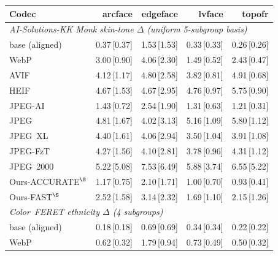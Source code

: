 \begin{tabular}{lrrrr}
\toprule
Codec & arcface & edgeface & lvface & topofr \\
\midrule
\multicolumn{5}{l}{\emph{AI-Solutions-KK Monk skin-tone $\Delta$ (uniform 5-subgroup basis)}}\\
\midrule
    base (aligned) & 0.37\,{\scriptsize[0.37]} & 1.53\,{\scriptsize[1.53]} & 0.33\,{\scriptsize[0.33]} & 0.26\,{\scriptsize[0.26]} \\
    WebP & 3.00\,{\scriptsize[0.90]} & 4.06\,{\scriptsize[2.30]} & 1.49\,{\scriptsize[0.52]} & 2.43\,{\scriptsize[0.47]} \\
    AVIF & 4.12\,{\scriptsize[1.17]} & 4.80\,{\scriptsize[2.58]} & 3.82\,{\scriptsize[0.81]} & 4.91\,{\scriptsize[0.68]} \\
    HEIF & 4.67\,{\scriptsize[1.53]} & 4.67\,{\scriptsize[2.95]} & 4.76\,{\scriptsize[0.97]} & 5.75\,{\scriptsize[0.90]} \\
    JPEG-AI & 1.43\,{\scriptsize[0.72]} & 2.54\,{\scriptsize[1.90]} & 1.31\,{\scriptsize[0.63]} & 1.21\,{\scriptsize[0.31]} \\
    JPEG & 4.81\,{\scriptsize[1.67]} & 4.02\,{\scriptsize[3.13]} & 5.16\,{\scriptsize[1.09]} & 5.80\,{\scriptsize[1.12]} \\
    JPEG~XL & 4.40\,{\scriptsize[1.61]} & 4.06\,{\scriptsize[2.94]} & 3.50\,{\scriptsize[1.04]} & 3.91\,{\scriptsize[1.08]} \\
    JPEG-FzT & 4.27\,{\scriptsize[1.56]} & 4.10\,{\scriptsize[2.81]} & 3.78\,{\scriptsize[0.96]} & 4.31\,{\scriptsize[1.12]} \\
    JPEG~2000 & 5.22\,{\scriptsize[5.08]} & 7.53\,{\scriptsize[6.49]} & 5.88\,{\scriptsize[3.74]} & 6.55\,{\scriptsize[5.22]} \\
    Ours-ACCURATE$^{\S}$ & 1.17\,{\scriptsize[0.75]} & 2.10\,{\scriptsize[1.71]} & 1.00\,{\scriptsize[0.70]} & 0.93\,{\scriptsize[0.41]} \\
    Ours-FAST$^{\S}$ & 2.52\,{\scriptsize[1.58]} & 3.14\,{\scriptsize[2.32]} & 1.69\,{\scriptsize[1.10]} & 2.15\,{\scriptsize[1.26]} \\
\midrule
\multicolumn{5}{l}{\emph{Color~FERET ethnicity $\Delta$ (4 subgroups)}}\\
\midrule
    base (aligned) & 0.18\,{\scriptsize[0.18]} & 0.69\,{\scriptsize[0.69]} & 0.34\,{\scriptsize[0.34]} & 0.22\,{\scriptsize[0.22]} \\
    WebP & 0.62\,{\scriptsize[0.32]} & 1.79\,{\scriptsize[0.94]} & 0.73\,{\scriptsize[0.49]} & 0.50\,{\scriptsize[0.32]} \\

\end{tabular}
